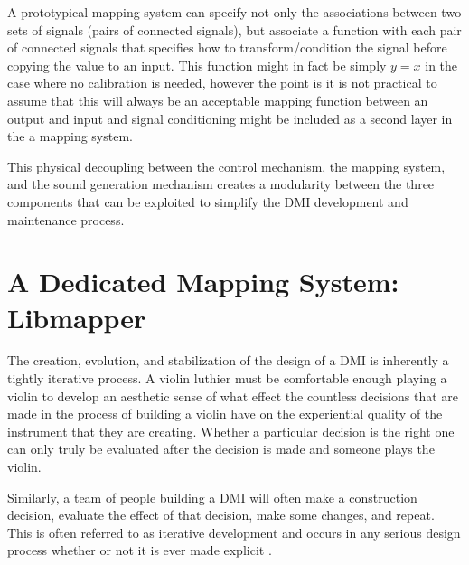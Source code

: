 A prototypical mapping system can specify not only the associations between two sets of signals (pairs of connected signals), but associate a function with each pair of connected signals that specifies how to transform/condition the signal before copying the value to an input. This function might in fact be simply \begin{math}y = x\end{math} in the case where no calibration is needed, however the point is it is not practical to assume that this will always be an acceptable mapping function between an output and input and signal conditioning might be included as a second layer in the a mapping system.

This physical decoupling between the control mechanism, the mapping system, and the sound generation mechanism creates a modularity between the three components that can be exploited to simplify the DMI development and maintenance process.

\section{A Dedicated Mapping System: Libmapper}

The creation, evolution, and stabilization of the design of a DMI is inherently a tightly iterative process. A violin luthier must be comfortable enough playing a violin to develop an aesthetic sense of what effect the countless decisions that are made in the process of building a violin have on the experiential quality of the instrument that they are creating. Whether a particular decision is the right one can only truly be evaluated after the decision is made and someone plays the violin. 

Similarly, a team of people building a DMI will often make a construction decision, evaluate the effect of that decision, make some changes, and repeat. This is often referred to as iterative development and occurs in any serious design process whether or not it is ever made explicit \cite{iterative2003}. 

